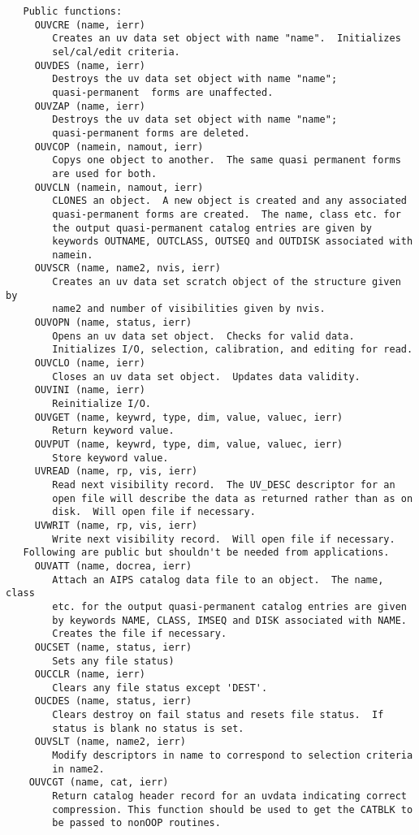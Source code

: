 {\begin{verbatim}
   Public functions:
     OUVCRE (name, ierr)
        Creates an uv data set object with name "name".  Initializes
        sel/cal/edit criteria.
     OUVDES (name, ierr)
        Destroys the uv data set object with name "name";
        quasi-permanent  forms are unaffected.
     OUVZAP (name, ierr)
        Destroys the uv data set object with name "name";
        quasi-permanent forms are deleted.
     OUVCOP (namein, namout, ierr)
        Copys one object to another.  The same quasi permanent forms
        are used for both.
     OUVCLN (namein, namout, ierr)
        CLONES an object.  A new object is created and any associated
        quasi-permanent forms are created.  The name, class etc. for
        the output quasi-permanent catalog entries are given by
        keywords OUTNAME, OUTCLASS, OUTSEQ and OUTDISK associated with
        namein.
     OUVSCR (name, name2, nvis, ierr)
        Creates an uv data set scratch object of the structure given by
        name2 and number of visibilities given by nvis.
     OUVOPN (name, status, ierr)
        Opens an uv data set object.  Checks for valid data.
        Initializes I/O, selection, calibration, and editing for read.
     OUVCLO (name, ierr)
        Closes an uv data set object.  Updates data validity.
     OUVINI (name, ierr)
        Reinitialize I/O.
     OUVGET (name, keywrd, type, dim, value, valuec, ierr)
        Return keyword value.
     OUVPUT (name, keywrd, type, dim, value, valuec, ierr)
        Store keyword value.
     UVREAD (name, rp, vis, ierr)
        Read next visibility record.  The UV_DESC descriptor for an
        open file will describe the data as returned rather than as on
        disk.  Will open file if necessary.
     UVWRIT (name, rp, vis, ierr)
        Write next visibility record.  Will open file if necessary.
   Following are public but shouldn't be needed from applications.
     OUVATT (name, docrea, ierr)
        Attach an AIPS catalog data file to an object.  The name, class
        etc. for the output quasi-permanent catalog entries are given
        by keywords NAME, CLASS, IMSEQ and DISK associated with NAME.
        Creates the file if necessary.
     OUCSET (name, status, ierr)
        Sets any file status)
     OUCCLR (name, ierr)
        Clears any file status except 'DEST'.
     OUCDES (name, status, ierr)
        Clears destroy on fail status and resets file status.  If
        status is blank no status is set.
     OUVSLT (name, name2, ierr)
        Modify descriptors in name to correspond to selection criteria
        in name2.
    OUVCGT (name, cat, ierr)
        Return catalog header record for an uvdata indicating correct
        compression. This function should be used to get the CATBLK to
        be passed to nonOOP routines.


\end{verbatim}}
